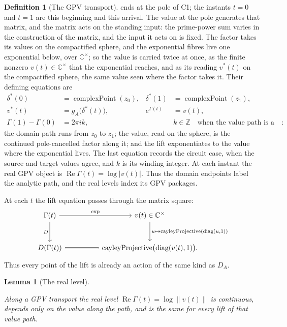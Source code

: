 \documentclass[11pt]{article}
\newcommand{\CC}{\mathbb{C}}
\newcommand{\ZZ}{\mathbb{Z}}
\providecommand{\lean}[1]{}
\providecommand{\uses}[1]{}
\theoremstyle{plain}
\newtheorem{lemma}[theorem]{Lemma}
\theoremstyle{definition}
\newtheorem{definition}[theorem]{Definition}
\theoremstyle{remark}
\begin{document}
\begin{definition}[The GPV transport]
ends at the pole of C1; the instants $t=0$ and
$t=1$ are this beginning and this arrival. The value at the pole
generates that matrix, and the matrix acts on the standing input: the prime-power sum
varies in the construction of the matrix, and the input it acts on is fixed.
The factor takes its values on the compactified sphere, and the exponential
fibres live one exponential below, over $\CC^{\times}$; so the value is carried twice at once, as the
finite nonzero $v(t)\in\CC^{\times}$ that the exponential reaches, and as its reading
$v^{*}(t)$ on the compactified sphere, the same value seen where the factor takes it. Their defining equations are
\[
\begin{aligned}
 \delta^*(0)&=\operatorname{complexPoint}(z_0),
 &\delta^*(1)&=\operatorname{complexPoint}(z_1),\\
 v^*(t)&=g_A\bigl(\delta^*(t)\bigr),
 &e^{\Gamma(t)}&=v(t),\\
 \Gamma(1)-\Gamma(0)&=2\pi i k,
 &&k\in\ZZ\quad\text{when the value path is a circuit}:
\end{aligned}
\]
the domain path runs from $z_0$ to $z_1$; the value, read on the sphere, is the
continued pole-cancelled factor along it; and the lift exponentiates to the
value where the exponential lives. The last equation records the circuit
case, when the source and target values agree, and $k$ is its winding
integer. At each instant the real GPV object is
$\operatorname{Re}\Gamma(t)=\log|v(t)|$. Thus the domain endpoints label
the analytic path, and the real levels index its GPV packages.
\end{definition}

At each $t$ the lift equation
passes through the matrix square:
\[
\begin{tikzcd}[column sep=huge,row sep=large]
\Gamma(t) \arrow[r,"\exp"] \arrow[d,"D"'] &
v(t)\in\CC^\times
  \arrow[d,"{u\mapsto\operatorname{cayleyProjective}(\operatorname{diag}(u,1))}"]\\
D(\Gamma(t)) \arrow[r,equal] &
\operatorname{cayleyProjective}\bigl(\operatorname{diag}(v(t),1)\bigr).
\end{tikzcd}
\]
Thus every point of the lift is already an action of the same kind as $D_A$.

\begin{lemma}[The real level]\label{lem:real-level}
\lean{ASection.GpvTransport.level, ASection.GpvTransport.continuous_level,
ASection.GpvTransport.lift_unique, ASection.GpvTransport.level_independent}
\uses{def:gpv-transport, thm:slice-exp, thm:winding-lift}
Along a GPV transport the real level
$\operatorname{Re}\Gamma(t)=\log\lVert v(t)\rVert$ is continuous, depends
only on the value along the path, and is the same for every lift of that
value path.
\end{lemma}
\end{document}
